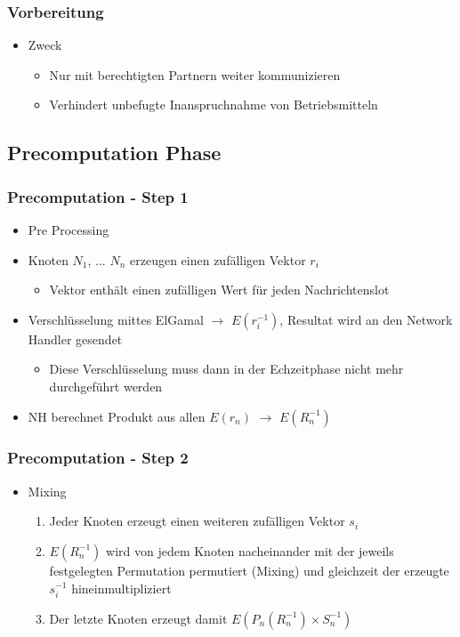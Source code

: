 \documentclass[t, xcolor=dvipsnames]{beamer}
\begin{document}
\begin{frame}
	\frametitle{Vorbereitung}
	\begin{itemize}
		\item Zweck
			\begin{itemize}
				\item Nur mit \alert{berechtigten Partnern} weiter kommunizieren
				\item Verhindert unbefugte Inanspruchnahme von Betriebsmitteln
			\end{itemize}
	\end{itemize}
	\vspace{\fill}
\end{frame}

\subsection{Precomputation Phase} %

\begin{frame}
	\frametitle{Precomputation - Step 1}
	\begin{itemize}
				\item Pre Processing

				\item Knoten $N_1$, ... $N_n$ erzeugen einen zufälligen Vektor $r_i$
				\begin{itemize}
					\item Vektor enthält einen zufälligen Wert für jeden Nachrichtenslot
				\end{itemize}
				\item Verschlüsselung mittes ElGamal $\rightarrow$ $E(r_i^{-1})$, Resultat wird an den Network Handler gesendet
				\begin{itemize}
					\item Diese Verschlüsselung muss dann in der Echzeitphase nicht mehr durchgeführt werden
				\end{itemize}
				\item NH berechnet Produkt aus allen $E(r_n)$ $\rightarrow$ $E(R_n^{-1})$  
		\end{itemize}
	\vspace{\fill}
\end{frame}

\begin{frame}
	\frametitle{Precomputation - Step 2}
	\begin{itemize}
				\item Mixing
				\begin{enumerate}
					\item Jeder Knoten erzeugt einen weiteren zufälligen Vektor $s_i$
					\item $E(R_n^{-1})$ wird von jedem Knoten nacheinander mit der jeweils festgelegten Permutation permutiert (Mixing) und gleichzeit der erzeugte $s_i^{-1}$ hineinmultipliziert
				\item Der letzte Knoten erzeugt damit $E(P_n(R_n^{-1}) \times S_n^{-1})$
				\end{enumerate}

	\end{itemize}
	\vspace{\fill}
\end{frame}
\end{document}
